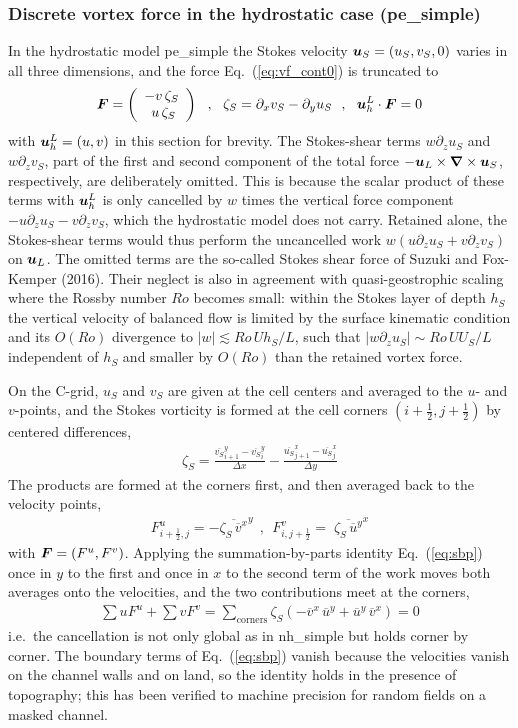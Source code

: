 \documentclass[12pt]{article}
\newcommand{\beq}  { \begin{eqnarray} }
\newcommand{\eeq}  { \end{eqnarray}}
\newcommand{\eq }  [1]{Eq.~(\ref{#1})}  %
\renewcommand{\v}[1]{{\mbox{\boldmath$ #1 $}}}  %
\newcommand{\pz}[1]{{\partial_z #1}}
\newcommand{\px}[1]{{\partial_x #1}}
\newcommand{\py}[1]{{\partial_y #1}}
\newcommand{\Bar}[1]{ \overline{ #1} }
\newcommand{\Vec}[1]{\left(\begin{array}{c} #1 \end{array}\right) }
\newcommand{\vn}{{\v \nabla}}
\newcommand{\lk}{\left(}
\newcommand{\rk}{\right)}
\begin{document}
\subsubsection*{Discrete vortex force in the hydrostatic case (pe\_simple)}

In the hydrostatic model pe\_simple the Stokes velocity $\v u_S = (u_S,v_S,0)$
varies in all three dimensions, and the force \eq{eq:vf_cont0} is truncated to
\beq
\v F = \Vec{ - v \, \zeta_S \\ \; u \, \zeta_S }
~~,~~ \zeta_S = \px{v_S} - \py{u_S}
~~,~~ \v u_h^L \cdot \v F = 0
\label{eq:vf_pe}
\eeq
with $\v u_h^L = (u,v)$ in this section for brevity.
The Stokes-shear terms $w \pz{u_S}$ and $w \pz{v_S}$, part of the first and
second component of the total force $-\v u_L \times \vn \times \v u_S$,
respectively, are deliberately omitted. This is because the scalar product
of these terms with $\v u_h^L$ is only cancelled by $w$ times the vertical
force component $-u \pz{u_S} - v \pz{v_S}$, which the hydrostatic model does
not carry. Retained alone, the Stokes-shear terms would thus perform the
uncancelled work $w \lk u \pz{u_S} + v \pz{v_S} \rk$ on $\v u_L$.
The omitted terms are the so-called Stokes shear force of Suzuki and
Fox-Kemper (2016). Their neglect is also in agreement with quasi-geostrophic
scaling where the Rossby number $Ro$ becomes small: within the Stokes layer
of depth $h_S$ the vertical velocity of balanced flow is limited by the
surface kinematic condition and its $O(Ro)$ divergence to
$|w| \lesssim Ro \, U h_S/L$, such that
$|w \pz{u_S}| \sim Ro \, U U_S / L$ independent of $h_S$ and smaller by
$O(Ro)$ than the retained vortex force.

On the C-grid, $u_S$ and $v_S$ are given at the cell centers and averaged
to the $u$- and $v$-points, and the Stokes vorticity is formed at the cell
corners $(i+\frac{1}{2},j+\frac{1}{2})$ by centered differences,
\beq
\zeta_S = \frac{ \Bar{v_S}^{y}_{i+1} - \Bar{v_S}^{y}_{i} }{\Delta x}
        - \frac{ \Bar{u_S}^{x}_{j+1} - \Bar{u_S}^{x}_{j} }{\Delta y}
\eeq
The products are formed at the corners first,
and then averaged back to the velocity points,
\beq
F^u_{i+\frac{1}{2},j} = - \Bar{\zeta_S \, \Bar{v}^{x} }^{y} ~~,~~
F^v_{i,j+\frac{1}{2}} = \; \Bar{ \zeta_S \, \Bar{u}^{y}}^{x}
\label{eq:vf_pe_disc}
\eeq
with $\v F = (F^u,F^v)$.
Applying the summation-by-parts identity \eq{eq:sbp} once in $y$ to the
first and once in $x$ to the second term of the work moves both averages
onto the velocities, and the two contributions meet at the corners,
\beq
\sum u F^u + \sum v F^v
= \sum_{\mathrm{corners}} \zeta_S
 \lk - \Bar{v}^{x} \, \Bar{u}^{y} + \Bar{u}^{y} \, \Bar{v}^{x} \rk = 0
\eeq
i.e.\ the cancellation is not only global as in nh\_simple but holds
corner by corner. The boundary terms of \eq{eq:sbp} vanish because the
velocities vanish on the channel walls and on land, so the identity holds
in the presence of topography; this has been verified to machine precision
for random fields on a masked channel.
\end{document}
